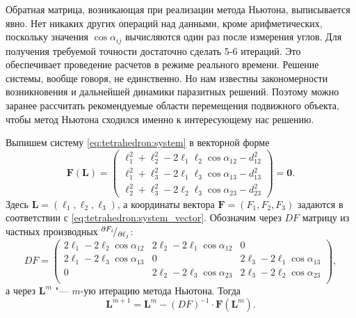 \documentclass[../main.tex]{subfiles}
\begin{document}
Обратная матрица, возникающая при реализации метода Ньютона, выписывается явно. Нет никаких других операций над данными, кроме арифметических, поскольку значения $\cos \alpha_{ij}$ вычисляются один раз после измерения углов. Для получения требуемой точности достаточно сделать 5-6 итераций. Это обеспечивает проведение расчетов в режиме реального времени. Решение системы, вообще говоря, не единственно. Но нам известны закономерности возникновения и дальнейшей динамики паразитных решений. Поэтому можно заранее рассчитать рекомендуемые области перемещения подвижного объекта, чтобы метод Ньютона сходился именно к интересующему нас решению.

Выпишем систему \eqref{eq:tetrahedron:system} в векторной форме
\begin{equation}\label{eq:tetrahedron:system_vector}
  \mathbf{F} (\mathbf{L})=
  \left(
    \begin{matrix}
      \ell_1^2+\ell_2^2-2 \ell_1 \ell_2 \cos \alpha_{12} - d_{12}^2 \\
      \ell_1^2+\ell_3^2-2 \ell_1 \ell_3 \cos \alpha_{13} - d_{13}^2 \\
      \ell_2^2+\ell_3^2-2 \ell_2 \ell_3 \cos \alpha_{23} - d_{23}^2
    \end{matrix}
  \right)
  = \mathbf{0}.
\end{equation}
Здесь $\mathbf{L}=(\ell_1,\ell_2,\ell_3)$, а координаты вектора $\mathbf{F}=(F_1, F_2,F_3)$ задаются в соответствии с \eqref{eq:tetrahedron:system_vector}. Обозначим через  $DF$ матрицу из частных производных ${}^{\partial F_i}\!/_{\partial \ell_j}$:
\begin{equation*}
DF=
\left(
  \begin{matrix}
    2\ell_1 - 2\ell_2 \cos \alpha_{12} & 2\ell_2 - 2\ell_1 \cos \alpha_{12} & 0  \\
    2\ell_1 - 2\ell_3 \cos \alpha_{13} & 0 & 2\ell_3 - 2\ell_1 \cos \alpha_{13}  \\
    0 & 2\ell_2 - 2\ell_3 \cos \alpha_{23} & 2\ell_3 - 2\ell_2 \cos \alpha_{23}  \\
  \end{matrix}
\right),
\end{equation*}
а через $\mathbf{L}^m$ "--- $m$-ую итерацию метода Ньютона. Тогда
\begin{equation*}
  \mathbf{L}^{m + 1} = \mathbf{L}^{m} - \left(DF\right)^{-1} \cdot \mathbf{F}\left(\mathbf{L}^{m}\right).
\end{equation*}
\end{document}
